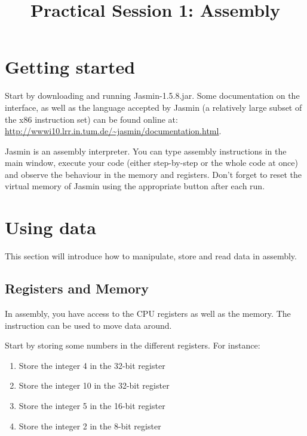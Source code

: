 \documentclass{../../tp}
\title{Practical Session 1: Assembly}
\author{}
\begin{document}
\maketitle


\section{Getting started}

Start by downloading and running \textsf{Jasmin-1.5.8.jar}. Some documentation on the interface, as well as the language accepted by Jasmin (a relatively large subset of the x86 instruction set) can be found online at: \url{http://wwwi10.lrr.in.tum.de/~jasmin/documentation.html}.

\textsf{Jasmin} is an assembly interpreter. You can type assembly instructions in the main window, execute your code (either step-by-step or the whole code at once) and observe the behaviour in the memory and registers. Don't forget to reset the virtual memory of Jasmin using the appropriate button after each run.

\section{Using data}

This section will introduce how to manipulate, store and read data in assembly.

\subsection{Registers and Memory}

In assembly, you have access to the CPU registers as well as the memory. The  instruction can be used to move data around. 

\begin{instruction}
Start by storing some numbers in the different registers. For instance:
	\begin{enumerate}
		\item Store the integer 4 in the 32-bit  register
		\item Store the integer 10 in the 32-bit  register 
		\item Store the integer 5 in the 16-bit  register
		\item Store the integer 2 in the 8-bit  register
	\end{enumerate}
\end{instruction}
\end{document}
